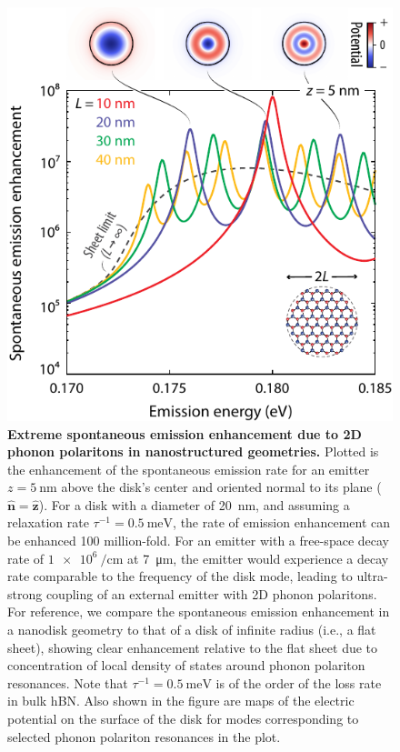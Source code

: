 \documentclass[aps,prb,twocolumn,
	           groupedaddress,superscriptaddress,
               amsfonts,amssymb,amsmath,floatfix,
	           citeautoscript]{revtex4-1}
\begin{document}
\begin{figure}[t]
    \includegraphics[width=.925\linewidth]{fig3.pdf}
    \caption{%
        \textbf{Extreme spontaneous emission enhancement due to 2D phonon polaritons in nanostructured geometries.} Plotted is the enhancement of the spontaneous emission rate for an emitter  $z=\SI{5}{\nm}$ above the disk's center and  oriented normal to its plane ($\hat{\mathbf{n}} = \hat{\mathbf{z}}$). For a disk with a diameter of \SI{20}{\nm}, and assuming a relaxation rate $\tau^{-1} = \SI{0.5}{\meV}$, the rate of emission enhancement can be enhanced \num{100} million-fold. For an emitter with a free-space decay rate of $\SI{1e6}{\per\cm}$ at \SI{7}{\micro\m}, the emitter would experience a decay rate comparable to the frequency of the disk mode, leading to ultra-strong coupling of an external emitter with 2D phonon polaritons. For reference, we compare the spontaneous emission enhancement in a nanodisk geometry to that of a disk of infinite radius (i.e., a flat sheet), showing clear enhancement relative to the flat sheet due to concentration of local density of states around phonon polariton resonances. Note that $\tau^{-1} = \SI{0.5}{\meV}$ is of the order of the loss rate in bulk hBN. Also shown in the figure are maps of the electric potential on the surface of the disk for modes corresponding to selected phonon polariton resonances in the plot. 
        \label{fig:3}
        }
\end{figure}
\end{document}

